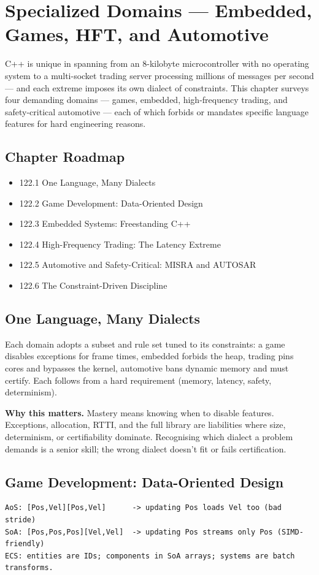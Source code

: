 \chapter{Specialized Domains --- Embedded, Games, HFT, and Automotive}

C++ is unique in spanning from an 8-kilobyte microcontroller with no operating system to a multi-socket trading server processing millions of messages per second --- and each extreme imposes its own dialect of constraints. This chapter surveys four demanding domains --- games, embedded, high-frequency trading, and safety-critical automotive --- each of which forbids or mandates specific language features for hard engineering reasons.

\section*{Chapter Roadmap}
\begin{itemize}
\item 122.1 One Language, Many Dialects
\item 122.2 Game Development: Data-Oriented Design
\item 122.3 Embedded Systems: Freestanding C++
\item 122.4 High-Frequency Trading: The Latency Extreme
\item 122.5 Automotive and Safety-Critical: MISRA and AUTOSAR
\item 122.6 The Constraint-Driven Discipline
\end{itemize}

\section{One Language, Many Dialects}
Each domain adopts a subset and rule set tuned to its constraints: a game disables exceptions for frame times, embedded forbids the heap, trading pins cores and bypasses the kernel, automotive bans dynamic memory and must certify. Each follows from a hard requirement (memory, latency, safety, determinism).

\textbf{Why this matters.} Mastery means knowing when to disable features. Exceptions, allocation, RTTI, and the full library are liabilities where size, determinism, or certifiability dominate. Recognising which dialect a problem demands is a senior skill; the wrong dialect doesn't fit or fails certification.

\section{Game Development: Data-Oriented Design}
\begin{lstlisting}[language=text, caption={Games use SoA/ECS for cache-friendly batch updates (Chapter 90).}]
AoS: [Pos,Vel][Pos,Vel]      -> updating Pos loads Vel too (bad stride)
SoA: [Pos,Pos,Pos][Vel,Vel]  -> updating Pos streams only Pos (SIMD-friendly)
ECS: entities are IDs; components in SoA arrays; systems are batch transforms.
\end{lstlisting}


